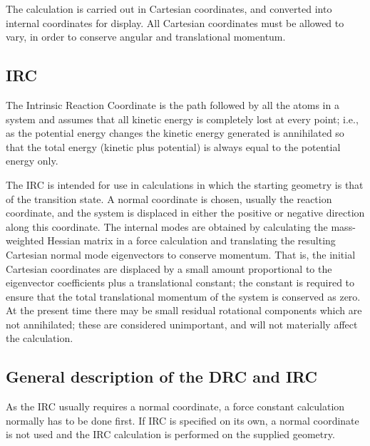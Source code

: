 The calculation  is  carried  out  in  Cartesian  coordinates,  and converted
into   internal  coordinates  for  display.   All  Cartesian coordinates must
be allowed to vary, in order to  conserve  angular  and translational
momentum.

\subsection*{IRC}
The Intrinsic Reaction Coordinate is the path followed by  all  the atoms  in
a  system  and assumes that  all kinetic energy is completely lost at every
point; i.e., as the potential energy changes  the  kinetic  energy generated
is  annihilated  so  that  the  total  energy  (kinetic  plus potential) is
always equal to the potential energy only.

The IRC is intended for use in calculations in which the starting geometry is
that of the transition state.  A   normal  coordinate  is  chosen,  usually
the  reaction coordinate, and the system  is  displaced  in  either  the
positive  or negative  direction  along  this  coordinate.   The  internal
modes are obtained by calculating the mass-weighted  Hessian  matrix  in  a
force calculation   and   translating  the  resulting  Cartesian  normal  mode
eigenvectors to conserve  momentum.   That  is,  the  initial  Cartesian
coordinates  are  displaced  by  a  small  amount  proportional  to  the
eigenvector coefficients plus a translational constant; the constant  is
required  to  ensure that the total translational momentum of the system is
conserved as zero.  At the present time there may be  small  residual
rotational  components  which  are not annihilated; these are considered
unimportant, and will not materially affect the calculation.

\subsection*{General description of the DRC and IRC}
As the IRC usually requires a normal coordinate, a  force  constant
calculation  normally  has to be done first.  If IRC is specified on its own, a
normal coordinate is not used and the IRC calculation is performed on the
supplied geometry.

